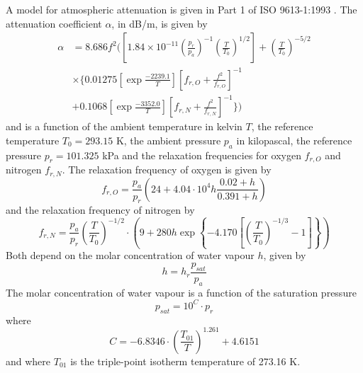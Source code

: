 A model for atmospheric attenuation is given in Part 1 of ISO 9613-1:1993 \cite{ISO9613-1}.
The attenuation coefficient $\alpha$, in dB/m, is given by
\begin{align}\label{eq:theory:sound:atmospheric-attenuation}
 \alpha &= 8.686 f^2 \Biggl( \left[ 1.84 \times 10^{-11} \left(\frac{p_r}{p_a}\right)^{-1} \left(\frac{T}{T_0}\right)^{1/2} \right] + \left(\frac{T}{T_0}\right)^{-5/2} \nonumber \\
 &\times \Biggl\{ 0.01275 \left[ \exp{\frac{-2239.1}{T}} \right]  \left[f_{r,O} + \frac{f^2}{f_{r,O}} \right]^{-1} \nonumber \\
 &+ 0.1068 \left[ \exp{\frac{-3352.0}{T}} \right] \left[ f_{r,N} + \frac{f^2}{f_{r,N}} \right]^{-1} \Biggr\} \Biggr)
\end{align}
and is a function of the ambient temperature in kelvin $T$, the reference
temperature $T_0=293.15$ K, the ambient pressure $p_a$ in kilopascal, the
reference pressure $p_r=101.325$ kPa and the relaxation frequencies for oxygen
$f_{r,O}$ and nitrogen $f_{r,N}$.
The relaxation frequency of oxygen is given by
\begin{equation}
 f_{r,O} = \frac{p_a}{p_r} \left( 24 + 4.04 \cdot 10^4 h \frac{0.02 + h}{0.391 + h}  \right)
\end{equation}
and the relaxation frequency of nitrogen by
\begin{equation}
 f_{r,N} = \frac{p_a}{p_r} \left( \frac{T}{T_0} \right)^{-1/2} \cdot \left( 9 + 280 h \exp{\left\{ -4.170 \left[ \left(\frac{T}{T_0} \right)^{-1/3} -1 \right] \right\} } \right)
\end{equation}
Both depend on the molar concentration of water vapour $h$, given by
\begin{equation}
 h = h_r  \frac{p_{sat}}{p_a}
\end{equation}
The molar concentration of water vapour is a function of the saturation pressure
\begin{equation}
 p_{sat} = 10^C \cdot p_r
\end{equation}
where
\begin{equation}
 C = -6.8346 \cdot \left( \frac{T_{01}}{T} \right)^{1.261}  + 4.6151
\end{equation}
and where $T_{01}$ is the triple-point isotherm temperature of 273.16 K.


